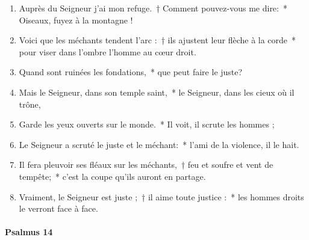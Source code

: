 \documentclass[twoside]{article}
\begin{document}
\begin{paracol}[1]{2}
\begin{enumerate}[wide, itemsep=0mm, labelwidth=!, labelindent=0pt, label=\color{gregoriocolor}\theenumi]
\item Auprès du Seigneur j'ai mon refuge.~† Comment pouvez-vous me dire:~* Oiseaux, fuyez à la montagne !
\item Voici que les méchants tendent l'arc :~† ils ajustent leur flèche à la corde~* pour viser dans l'ombre l'homme au cœur droit.
\item Quand sont ruinées les fondations,~* que peut faire le juste?
\item Mais le Seigneur, dans son temple saint,~* le Seigneur, dans les cieux où il trône, 
\item Garde les yeux ouverts sur le monde.~* Il voit, il scrute les hommes ;
\item Le Seigneur a scruté le juste et le méchant:~* l'ami de la violence, il le hait.
\item Il fera pleuvoir ses fléaux sur les méchants,~† feu et soufre et vent de tempête;~* c'est la coupe qu'ils auront en partage.
\item Vraiment, le Seigneur est juste ;~† il aime toute justice :~* les hommes droits le verront face à face.
\end{enumerate}

\switchcolumn*

\paragraph{Psalmus 14}



\end{paracol}
\end{document}
